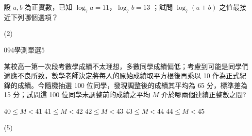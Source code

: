 \begin{QUESTIONS}
\begin{QUESTION}
\begin{QBODY}
			設 $a, b$ 為正實數，已知 $\log_7 a = 11$，$\log_7 b = 13$ ；試問 $\log_7 (a + b)$ 之值最接近下列哪個選項？ 
			\begin{QOPS} 
			\end{QOPS}
        \end{QBODY}
        \begin{QFROMS}
        \end{QFROMS}
        \begin{QTAGS}\end{QTAGS}
        \begin{QANS}
            (2)
        \end{QANS}
        \begin{QSOLLIST}
        \end{QSOLLIST}
        \begin{QEMPTYSPACE}
        \end{QEMPTYSPACE}
    \end{QUESTION}
    \begin{QUESTION}
        \begin{ExamInfo}{094}{學測}{單選}{5}
        \end{ExamInfo}
        \begin{ExamAnsRateInfo}{8}{10}{7}{7}
        \end{ExamAnsRateInfo}
        \begin{QBODY}
			某校高一第一次段考數學成績不太理想，多數同學成績偏低；考慮到可能是同學們適應不良所致，數學老師決定將每人的原始成績取平方根後再乘以 10 作為正式紀錄的成績。今隨機抽選 100 位同學，發現調整後的成績其平均為 65 分，標準差為 15 分；試問這 100 位同學未調整前的成績之平均 $M$ 介於哪兩個連續正整數之間? 
			\begin{QOPS} 
				\QOP $40 \leq M <41$ 
				\QOP $41\leq  M<42$ 
				\QOP$ 42 \leq M<43$        
				\QOP $43 \leq M<44$        
				\QOP $44\leq  M<45$
			\end{QOPS}
        \end{QBODY}
        \begin{QFROMS}
        \end{QFROMS}
        \begin{QTAGS}\end{QTAGS}
        \begin{QANS}
            (5)
        \end{QANS}
        \begin{QSOLLIST}
        \end{QSOLLIST}
        \begin{QEMPTYSPACE}
        \end{QEMPTYSPACE}
    \end{QUESTION}
\end{QUESTIONS}
